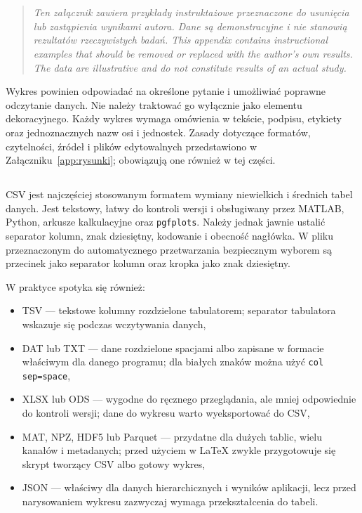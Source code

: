 \chapter{}
\label{app:wykresy}

\begin{quote}
\itshape
\ploren
  {Ten załącznik zawiera przykłady instruktażowe przeznaczone do usunięcia lub zastąpienia wynikami autora. Dane są demonstracyjne i nie stanowią rezultatów rzeczywistych badań.}
  {This appendix contains instructional examples that should be removed or replaced with the author's own results. The data are illustrative and do not constitute results of an actual study.}
\end{quote}

Wykres powinien odpowiadać na określone pytanie i umożliwiać poprawne odczytanie danych. Nie należy traktować go wyłącznie jako elementu dekoracyjnego. Każdy wykres wymaga omówienia w tekście, podpisu, etykiety oraz jednoznacznych nazw osi i jednostek. Zasady dotyczące formatów, czytelności, źródeł i plików edytowalnych przedstawiono w Załączniku~\ref{app:rysunki}; obowiązują one również w tej części.

\section{}

CSV jest najczęściej stosowanym formatem wymiany niewielkich i średnich tabel danych. Jest tekstowy, łatwy do kontroli wersji i obsługiwany przez MATLAB, Python, arkusze kalkulacyjne oraz \texttt{pgfplots}. Należy jednak jawnie ustalić separator kolumn, znak dziesiętny, kodowanie i obecność nagłówka. W pliku przeznaczonym do automatycznego przetwarzania bezpiecznym wyborem są przecinek jako separator kolumn oraz kropka jako znak dziesiętny.

W praktyce spotyka się również:

\begin{itemize}
  \item TSV — tekstowe kolumny rozdzielone tabulatorem; separator tabulatora wskazuje się podczas wczytywania danych,
  \item DAT lub TXT — dane rozdzielone spacjami albo zapisane w formacie właściwym dla danego programu; dla białych znaków można użyć \verb|col sep=space|,
  \item XLSX lub ODS — wygodne do ręcznego przeglądania, ale mniej odpowiednie do kontroli wersji; dane do wykresu warto wyeksportować do CSV,
  \item MAT, NPZ, HDF5 lub Parquet — przydatne dla dużych tablic, wielu kanałów i metadanych; przed użyciem w LaTeX zwykle przygotowuje się skrypt tworzący CSV albo gotowy wykres,
  \item JSON — właściwy dla danych hierarchicznych i wyników aplikacji, lecz przed narysowaniem wykresu zazwyczaj wymaga przekształcenia do tabeli.
\end{itemize}

